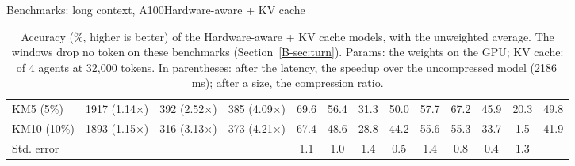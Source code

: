 \documentclass[aspectratio=169,10pt]{beamer}
\begin{document}
\begin{frame}{Benchmarks: long context, A100}{Hardware-aware + KV cache}
\begin{table}
\begin{adjustbox}{width=\linewidth, totalheight=0.64\textheight, keepaspectratio, center}
{\begin{tabular}{lcccccccccccc}
KM5 (5\%) & 1917 (1.14$\times$) & 392 (2.52$\times$) & 385 (4.09$\times$) & 69.6 & 56.4 & 31.3 & 50.0 & 57.7 & 67.2 & 45.9 & 20.3 & 49.8 \\
KM10 (10\%) & 1893 (1.15$\times$) & 316 (3.13$\times$) & 373 (4.21$\times$) & 67.4 & 48.6 & 28.8 & 44.2 & 55.6 & 55.3 & 33.7 & 1.5 & 41.9 \\
\midrule
Std. error & & & & 1.1 & 1.0 & 1.4 & 0.5 & 1.4 & 0.8 & 0.4 & 1.3 &  \\
\bottomrule
\end{tabular}}
\end{adjustbox}
\caption{Accuracy (\%, higher is better) of the Hardware-aware + KV cache models, with the unweighted average. The windows drop no token on these benchmarks (Section~\ref{B-sec:turn}). Params: the weights on the GPU; KV cache: of 4 agents at 32{,}000 tokens. In parentheses: after the latency, the speedup over the uncompressed model (2186\,ms); after a size, the compression ratio.}\label{tab:kvresults}
\end{table}
\end{frame}
\end{document}
